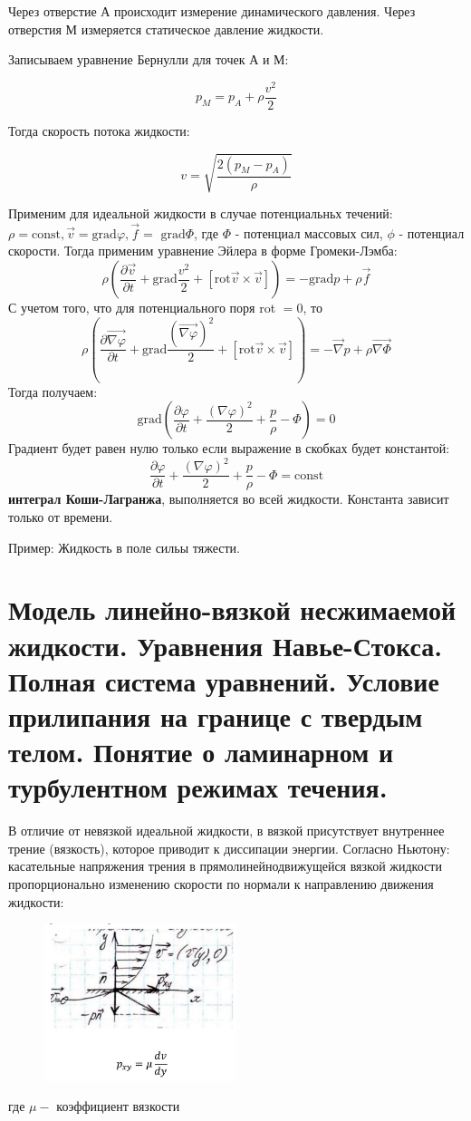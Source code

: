 Через отверстие А происходит измерение динамического давления. Через отверстия М измеряется статическое давление жидкости.

Записываем уравнение Бернулли для точек А и М:

$$
p_{M}=p_{A}+\rho \frac{v^{2}}{2}
$$

Тогда скорость потока жидкости:

$$
v=\sqrt{\frac{2\left(p_{M}-p_{A}\right)}{\rho}}
$$

Применим для идеальной жидкости в случае потенциальньх течений: $\rho=\mathrm{const}, \vec{v}=\mathrm{grad} \varphi, \vec{f}=$ $\mathrm{grad} \Phi$, где $\Phi$ - потенциал массовых сил, $\phi$ - потенциал скорости. Тогда применим уравнение Эйлера в форме Громеки-Лэмба:
$$
\rho\left(\frac{\partial \vec{v}}{\partial t}+\mathrm{grad} \frac{v^2}{2}+[\mathrm{rot} \vec{v} \times \vec{v}]\right)=-\mathrm{grad} p+\rho \vec{f}
$$
С учетом того, что для потенциального поря rot $=0$, то
$$
\rho\left(\frac{\partial \overrightarrow{\nabla \varphi}}{\partial t}+\mathrm{grad} \frac{(\overrightarrow{\nabla \varphi})^2}{2}+[\mathrm{rot} \vec{v} \times \vec{v}]\right)=-\vec{\nabla} p+\rho \overrightarrow{\nabla \Phi}
$$
Тогда получаем:
$$
\mathrm{grad}\left(\frac{\partial \varphi}{\partial t}+\frac{(\nabla \varphi)^2}{2}+\frac{p}{\rho}-\Phi\right)=0
$$
Градиент будет равен нулю только если выражение в скобках будет константой:
$$
\frac{\partial \varphi}{\partial t}+\frac{(\nabla \varphi)^2}{2}+\frac{p}{\rho}-\Phi=\mathrm{const}
$$
 \textbf{интеграл Коши-Лагранжа}, выполняется во всей жидкости. Константа зависит только от времени.

 
Пример: Жидкость в поле сильы тяжести.

\section{Модель линейно-вязкой несжимаемой жидкости. Уравнения Навье-Стокса. Полная система уравнений. Условие прилипания на границе с твердым телом. Понятие о ламинарном и турбулентном режимах течения.}


В отличие от невязкой идеальной жидкости, в вязкой присутствует внутреннее трение (вязкость), которое приводит к диссипации энергии. Согласно Ньютону: касательные напряжения трения в прямолинейнодвижущейся вязкой жидкости пропорционально изменению скорости по нормали к направлению движения жидкости:
\begin{figure}[h!]
    \centering
    \includegraphics[width=0.5\textwidth]{2023_05_21_6e9b4e8657e82b213c6ag-17}
\end{figure}
где $\mu-$ коэффициент вязкости

